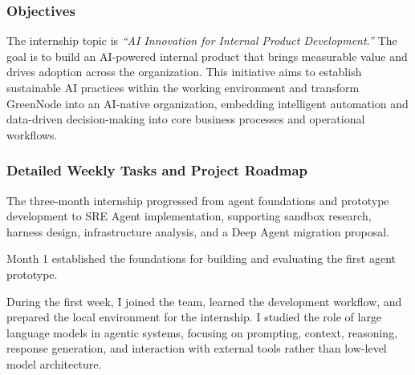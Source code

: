 \subsubsection{Objectives}

The internship topic is \emph{“AI Innovation for Internal Product Development.”} The goal is to build an AI-powered internal product that brings measurable value and drives adoption across the organization. This initiative aims to establish sustainable AI practices within the working environment and transform GreenNode into an AI-native organization, embedding intelligent automation and data-driven decision-making into core business processes and operational workflows.

\subsubsection{Detailed Weekly Tasks and Project Roadmap}

The three-month internship progressed from agent foundations and prototype development to SRE Agent implementation, supporting sandbox research, harness design, infrastructure analysis, and a Deep Agent migration proposal.

{}

Month 1 established the foundations for building and evaluating the first agent prototype.


During the first week, I joined the team, learned the development workflow, and prepared the local environment for the internship. I studied the role of large language models in agentic systems, focusing on prompting, context, reasoning, response generation, and interaction with external tools rather than low-level model architecture.


